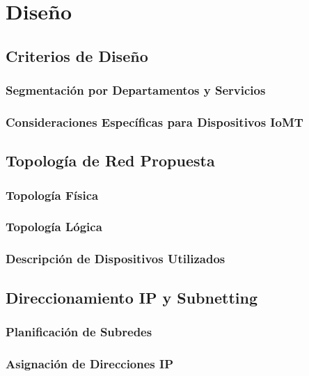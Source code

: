 
\chapter{Diseño}\label{diseño}

\section{Criterios de Diseño}

\subsection{Segmentación por Departamentos y Servicios}

\subsection{Consideraciones Específicas para Dispositivos IoMT}

\section{Topología de Red Propuesta}

\subsection{Topología Física}

\subsection{Topología Lógica}

\subsection{Descripción de Dispositivos Utilizados}

\section{Direccionamiento IP y Subnetting}

\subsection{Planificación de Subredes}

\subsection{Asignación de Direcciones IP}

